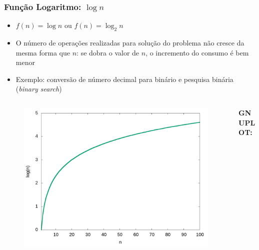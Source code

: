 \documentclass[aspectratio=169]{beamer}
\begin{document}
\begin{frame}\frametitle{Função Logaritmo: $\log n$}
\begin{itemize}
	\item $f(n) = \log{}n$ ou $f(n) = \log_{2}n$
	\item O número de operações realizadas para solução do problema não cresce da mesma forma que $n$: se dobra o valor de $n$, o incremento do consumo é bem menor
	\item Exemplo: conversão de número decimal para binário e pesquisa binária (\emph{binary search})
\end{itemize}
\vspace{-5mm}
\begin{columns}[T]
\begin{column}{0.6\linewidth}
\begin{figure}[h]
	\centering
	\includegraphics[height=0.5\paperheight]{graficos/log_n.jpg}
\end{figure}
\end{column}
\begin{column}{0.4\linewidth}
\vspace{5mm}
{\fontsize{0}{4}\selectfont{}\textbf{GNUPLOT:}

}
\end{column}
\end{columns}
\end{frame}
\end{document}
